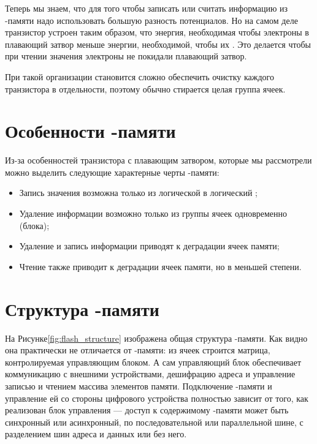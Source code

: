 \par{Теперь мы знаем, что для того чтобы записать или считать информацию из -памяти надо использовать большую разность потенциалов. Но на самом деле транзистор устроен таким образом, что энергия, необходимая чтобы  электроны в плавающий затвор меньше энергии, необходимой, чтобы их . Это делается чтобы при чтении значения электроны не покидали плавающий затвор.}

\par{При такой организации становится сложно обеспечить очистку каждого транзистора в отдельности, поэтому обычно стирается целая группа ячеек.}

\section{Особенности -памяти}

\par{Из-за особенностей транзистора с плавающим затвором, которые мы рассмотрели можно выделить следующие характерные черты -памяти:
\begin{itemize}
  \item Запись значения возможна только из логической  в логический ;
  \item Удаление информации возможно только из группы ячеек одновременно (блока);
  \item Удаление и запись информации приводят к деградации ячеек памяти;
  \item Чтение также приводит к деградации ячеек памяти, но в меньшей степени.
\end{itemize}}

\section{Структура -памяти}

\par{На Рисунке\ref{fig:flash_structure} изображена общая структура -памяти. Как видно она практически не отличается от -памяти: из ячеек строится матрица, контролируемая управляющим блоком. А сам управляющий блок обеспечивает коммуникацию с внешними устройствами, дешифрацию адреса и управление записью и чтением массива элементов памяти. Подключение -памяти и управление ей со стороны цифрового устройства полностью зависит от того, как реализован блок управления --- доступ к содержимому -памяти может быть синхронный или асинхронный, по последовательной или параллельной шине, с разделением шин адреса и данных или без него.}


